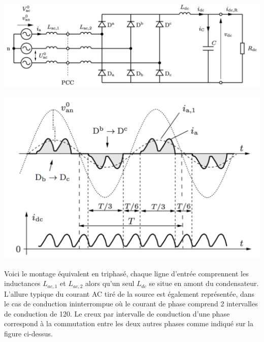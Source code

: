 		\begin{center}
		\begin{minipage}{0.45\textwidth}
			\begin{flushleft}
			\includegraphics[scale=0.4]{ch2/18}
			\end{flushleft}
		\end{minipage}			
		\begin{minipage}{0.45\textwidth}
			\begin{flushright}
			\includegraphics[scale=0.4]{ch2/19}
			\end{flushright}
		\end{minipage}			
		\end{center}
		
		Voici le montage équivalent en triphasé, chaque ligne d'entrée comprennent les inductances $L_{ac,1}$ et $L_{ac,2}$ alors qu'un seul $L_{dc}$ se situe en amont du condensateur. L'allure typique du courant AC tiré de la source est également représentée, dans le cas de conduction ininterrompue où le courant de phase comprend 2 intervalles de conduction de 120\degres . Le creux par intervalle de conduction d'une phase correspond à la commutation entre les deux autres phases comme indiqué sur la figure ci-dessus.\\
		
